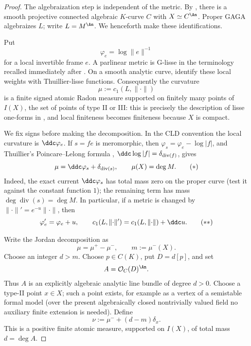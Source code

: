 
\begin{proof}
The algebraization step is independent of the metric.  By
\cite[Thm.~1.8.1]{Lutkebohmert2016RigidCurves}, there is a smooth
projective connected algebraic \(K\)-curve \(C\) with
\(X\simeq C^{\An}\).  Proper GAGA
\cite[Thm.~1.6.11]{Lutkebohmert2016RigidCurves} algebraizes \(L\); write
\(L=M^{\An}\).  We henceforth make these identifications.

Put
\[
                    \varphi_e=\log\lVert e\rVert^{-1}
\]
for a local invertible frame \(e\).  A parlinear metric is G-lisse in the
terminology recalled immediately after \cite[Def.~17.8.1]{CLD25}.  On a
smooth analytic curve, \cite[Props.~3.2.4--3.2.5]{Thu05} identify these
local weights with Thuillier-lisse functions.  Consequently the curvature
\[
                   \mu:=c_1(L,\lVert\cdot\rVert)
\]
is a finite signed atomic Radon measure supported on finitely many points
of \(I(X)\), the set of points of type II or III: this is precisely the
description of lisse one-forms in \cite[Def.~3.2.1(ii)]{Thu05}, and local
finiteness becomes finiteness because \(X\) is compact.

We fix signs before making the decomposition.  In the CLD convention the
local curvature is \(\ddc\varphi_e\).  If \(s=f e\) is meromorphic, then
\(\varphi_s=\varphi_e-\log|f|\), and Thuillier's Poincare--Lelong formula
\cite[Prop.~3.3.15]{Thu05},
\(\ddc\log|f|=\delta_{\operatorname{div}(f)}\), gives
\[
 \mu=\ddc\varphi_s+\delta_{\operatorname{div}(s)},
 \qquad
 \mu(X)=\deg M.
\tag{\(*\)}
\]
Indeed, the exact current \(\ddc\varphi_s\) has total mass zero on the
proper curve (test it against the constant function \(1\)); the remaining
term has mass \(\deg\operatorname{div}(s)=\deg M\).  In particular, if a
metric is changed by
\(\lVert\cdot\rVert' =e^{-u}\lVert\cdot\rVert\), then
\[
 \varphi_e'=\varphi_e+u,
 \qquad
 c_1(L,\lVert\cdot\rVert')=
 c_1(L,\lVert\cdot\rVert)+\ddc u.
\tag{\(**\)}
\]

Write the Jordan decomposition as
\[
                       \mu=\mu^+-\mu^-,
 \qquad m:=\mu^-(X).
\]
Choose an integer \(d>m\).  Choose \(p\in C(K)\), put
\(D=d[p]\), and set
\[
                         A=\mathcal O_C(D)^{\An}.
\]
Thus \(A\) is an explicitly algebraic analytic line bundle of degree
\(d>0\).  Choose a type-II point \(x\in X\); such a point exists, for
example as a vertex of a semistable formal model (over the present
algebraically closed nontrivially valued field no auxiliary finite
extension is needed).  Define
\[
                  \nu:=\mu^-+(d-m)\delta_x.
\tag{\(\dagger\)}
\]
This is a positive finite atomic measure, supported on \(I(X)\), of total
mass \(d=\deg A\).


\end{proof}
